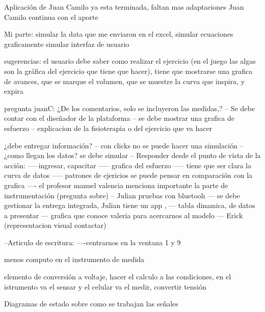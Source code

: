 Aplicación de Juan Camilo ya esta terminada,
faltan mas adaptaciones
Juan Camilo continua con el aporte



Mi parte: simular la data que me enviaron en el excel, 
simular ecuaciones graficamente
simular interfaz de usuario


sugerencias:
el usuario debe saber como realizar el ejercicio (en el juego las algas son la gráfica del ejercicio que tiene que hacer), tiene que mostrarse una grafica de avances, que se marque el volumen, que se muestre la curva que inspira, y expira

pregunta juanC: ¿De los comentarios, solo se incluyeron las medidas,?
-- Se debe contar con el diseñador de la plataforma
-- se debe mostrar una grafica de esfuerzo
-- explicacion de la fisioterapia o del ejercicio que va hacer

¿debe entregar información?
-- con clicks no se puede hacer una simulación
-- ¿como llegan los datos? se debe simular
-- Responder desde el punto de vista de la acción:
-----ingresar, capacitar
----- grafica del esfuerzo
----- tiene que ser clara la curva de datos
----- patrones de ejericios se puede pensar en comparación con la grafica
---- el profesor manuel valencia menciona importante la parte de instrumentación (pregunta sobre)
-- Julian pruebas con bluetooh
--- se debe gestionar la entrega integrada, Julian tiene un app ,
--- tabla dinamica, de datos a presentar
--- grafica que conoce valeria para acercarnos al modelo
--- Erick (representacion visual contactar)

--Articulo de escritura:
----centrarnos en la ventana 1 y 9

menos computo en el instrumento de medida

elemento de conversión a voltaje, hacer el calculo a las condiciones, en el istrumento va el sensar y el celular va el medir, convertir tensión 

Diagramas de estado sobre como se trabajan las señales

